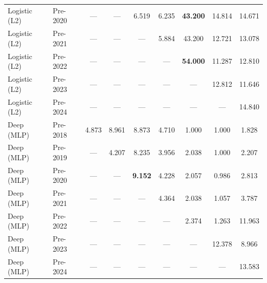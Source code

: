 \begin{table}[htbp]
{\begin{tabular}{l lccccccc}
Logistic (L2) & Pre-2020 & --- & --- & 6.519 & 6.235 & \textbf{43.200} & 14.814 & 14.671 \\
Logistic (L2) & Pre-2021 & --- & --- & --- & 5.884 & 43.200 & 12.721 & 13.078 \\
Logistic (L2) & Pre-2022 & --- & --- & --- & --- & \textbf{54.000} & 11.287 & 12.810 \\
Logistic (L2) & Pre-2023 & --- & --- & --- & --- & --- & 12.812 & 11.646 \\
Logistic (L2) & Pre-2024 & --- & --- & --- & --- & --- & --- & 14.840 \\
Deep (MLP) & Pre-2018 & 4.873 & 8.961 & 8.873 & 4.710 & 1.000 & 1.000 & 1.828 \\
Deep (MLP) & Pre-2019 & --- & 4.207 & 8.235 & 3.956 & 2.038 & 1.000 & 2.207 \\
Deep (MLP) & Pre-2020 & --- & --- & \textbf{9.152} & 4.228 & 2.057 & 0.986 & 2.813 \\
Deep (MLP) & Pre-2021 & --- & --- & --- & 4.364 & 2.038 & 1.057 & 3.787 \\
Deep (MLP) & Pre-2022 & --- & --- & --- & --- & 2.374 & 1.263 & 11.963 \\
Deep (MLP) & Pre-2023 & --- & --- & --- & --- & --- & 12.378 & 8.966 \\
Deep (MLP) & Pre-2024 & --- & --- & --- & --- & --- & --- & 13.583 \\
\bottomrule
\end{tabular}%
}
\end{table}